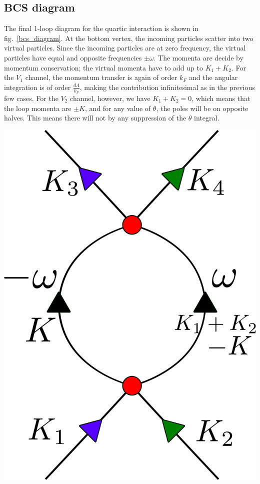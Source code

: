 \documentclass[14pt]{extarticle}
\begin{document}
\subsection{BCS diagram}
\begin{minipage}{0.65\textwidth}
The final 1-loop diagram for the quartic interaction is shown in fig.~\ref{bcs_diagram}. At the bottom vertex, the incoming particles scatter into two virtual particles. Since the incoming particles are at zero frequency, the virtual particles have equal and opposite frequencies \(\pm \omega\). The momenta are decide by momentum conservation; the virtual momenta have to add up to \(K_1 + K_2\). For the \(V_1\) channel, the momentum transfer is again of order \(k_F\) and the angular integration is of order \(\frac{d\Lambda}{k_F}\), making the contribution infinitesimal as in the previous few cases. For the \(V_2\) channel, however, we have \(K_1 + K_2 = 0\), which means that the loop momenta are \(\pm K\), and for any value of \(\theta\), the poles will be on opposite halves. This means there will not by any suppression of the \(\theta\) integral.
\end{minipage}
\hspace*{\fill}
\begin{minipage}{0.3\textwidth}
	\centering
	\includegraphics[width=\textwidth]{./figures/term6.pdf}
	\label{bcs_diagram}
\end{minipage}
\end{document}
